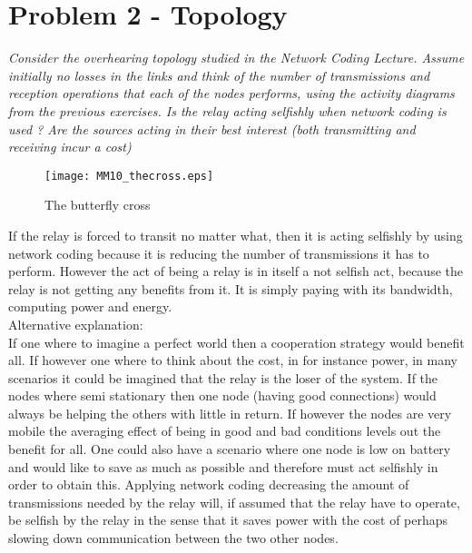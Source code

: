 \section{Problem 2 - Topology}
\textit{Consider the overhearing topology studied in the Network Coding Lecture. Assume initially no losses in the links and think of the number of transmissions and reception operations that each of the nodes performs, using the activity diagrams from the previous exercises. Is the relay acting selfishly when network coding is used ? Are the sources acting in their best interest (both transmitting and receiving incur a cost)}
\begin{figure}[!h]
  \centering
  \texttt{[image: MM10\_thecross.eps]}
  \caption{The butterfly cross}
  \label{fig:MM10_thecross}
\end{figure}

If the relay is forced to transit no matter what, then it is acting selfishly by using network coding because it is reducing the number of transmissions it has to perform. However the act of being a relay is in itself a not selfish act, because the relay is not getting any benefits from it. It is simply paying with its bandwidth, computing power and energy.\\

Alternative explanation:\\

If one where to imagine a perfect world then a cooperation strategy would benefit all. If however one where to think about the cost, in for instance power, in many scenarios it could be imagined that the relay is the loser of the system. If the nodes where semi stationary then one node (having good connections) would always be helping the others with little in return. If however the nodes are very mobile the averaging effect of being in good and bad conditions levels out the benefit for all. One could also have a scenario where one node is low on battery and would like to save as much as possible and therefore must act selfishly in order to obtain this. Applying network coding decreasing the amount of transmissions needed by the relay will, if assumed that the relay have to operate, be selfish by the relay in the sense that it saves power with the cost of perhaps slowing down communication between the two other nodes.